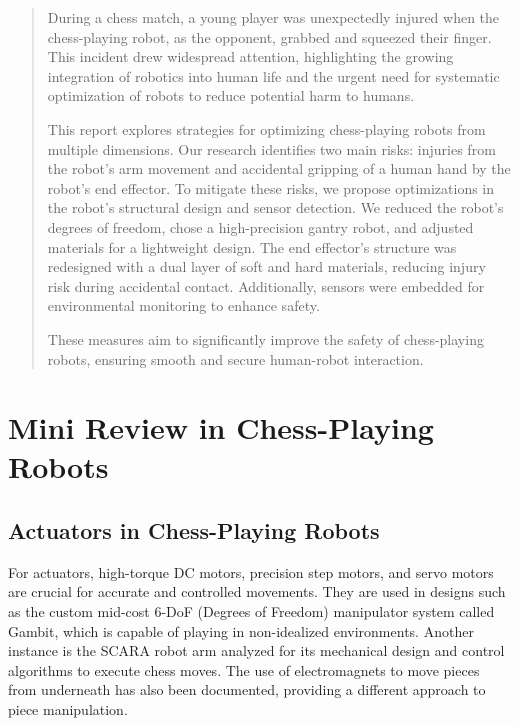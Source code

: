 \documentclass[10pt, a4paper, twocolumn]{article}
\begin{document}
\begin{abstract}
During a chess match, a young player was unexpectedly injured when the chess-playing robot, as the opponent, grabbed and squeezed their finger. This incident drew widespread attention, highlighting the growing integration of robotics into human life and the urgent need for systematic optimization of robots to reduce potential harm to humans. 

This report explores strategies for optimizing chess-playing robots from multiple dimensions. Our research identifies two main risks: injuries from the robot's arm movement and accidental gripping of a human hand by the robot's end effector. To mitigate these risks, we propose optimizations in the robot's structural design and sensor detection. We reduced the robot's degrees of freedom, chose a high-precision gantry robot, and adjusted materials for a lightweight design. The end effector's structure was redesigned with a dual layer of soft and hard materials, reducing injury risk during accidental contact. Additionally, sensors were embedded for environmental monitoring to enhance safety. 

These measures aim to significantly improve the safety of chess-playing robots, ensuring smooth and secure human-robot interaction.
\end{abstract}

\section{Mini Review in Chess-Playing Robots}

\subsection{Actuators in Chess-Playing Robots}
For actuators, high-torque DC motors, precision step motors, and servo motors are crucial for accurate and controlled movements. They are used in designs such as the custom mid-cost 6-DoF (Degrees of Freedom) manipulator system called Gambit, which is capable of playing in non-idealized environments\cite{Gambit}. Another instance is the SCARA robot arm analyzed for its mechanical design and control algorithms to execute chess moves\cite{anh2016design}. The use of electromagnets to move pieces from underneath has also been documented, providing a different approach to piece manipulation\cite{chess_playing_robot_vub}.
\end{document}
